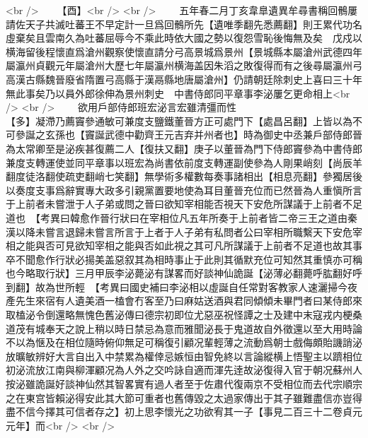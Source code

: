 <br />
　　【酉】<br />
<br />
　　五年春二月丁亥韋臯遺異牟尋書稱回鶻屢請佐天子共滅吐蕃王不早定計一旦爲回鶻所先【遺唯季翻先悉薦翻】則王累代功名虛棄矣且雲南久為吐蕃屈辱今不乘此時依大國之勢以復怨雪恥後悔無及矣　戊戍以横海留後程懷直爲滄州觀察使懷直請分弓高景城爲景州【景城縣本屬滄州武德四年屬瀛州貞觀元年屬滄州大歷七年屬瀛州横海盖因朱滔之敗復得而有之後尋屬瀛州弓高漢古縣魏晉廢省隋置弓高縣于漢鬲縣地唐屬滄州】仍請朝廷除刺史上喜曰三十年無此事矣乃以員外郎徐伸為景州刺史　中書侍郎同平章事李泌屢乞更命相上<br />
<br />
　　欲用戶部侍郎班宏泌言宏雖清彊而性　　　　　　　　　　　　　　　　　　　　【多】凝滯乃薦竇參通敏可兼度支鹽鐵董晉方正可處門下【處昌呂翻】上皆以為不可參誕之玄孫也【竇誕武德中勸齊王元吉弃并州者也】時為御史中丞兼戶部侍郎晉為太常卿至是泌疾甚復薦二人【復扶又翻】庚子以董晉為門下侍郎竇參為中書侍郎兼度支轉運使並同平章事以班宏為尚書依前度支轉運副使參為人剛果峭刻【尚辰羊翻度徒洛翻使疏吏翻峭七笑翻】無學術多權數每奏事諸相出【相息亮翻】參獨居後以奏度支事爲辭實專大政多引親黨置要地使為耳目董晉充位而已然晉為人重愼所言于上前者未嘗泄于人子弟或問之晉曰欲知宰相能否視天下安危所謀議于上前者不足道也　【考異曰韓愈作晉行狀曰在宰相位凡五年所奏于上前者皆二帝三王之道由秦漢以降未嘗言退歸未嘗言所言于上者于人子弟有私問者公曰宰相所職繫天下安危宰相之能與否可見欲知宰相之能與否如此視之其可凡所謀議于上前者不足道也故其事卒不聞愈作行狀必揚美盖惡叙其為相時事止于此則其循默充位可知然其重慎亦可稱也今略取行狀】三月甲辰李泌薨泌有謀畧而好談神仙詭誕【泌薄必翻薨呼肱翻好呼到翻】故為世所輕　【考異曰國史補曰李泌相以虛誕自任常對客教家人速灑掃今夜產先生來宿有人遺美酒一榼會冇客至乃曰麻姑送酒與君同傾傾未畢門者曰某侍郎來取榼泌令倒還略無愧色舊泌傳曰德宗初即位尤惡巫祝怪譚之士及建中末寇戎内梗桑道茂有城奉天之說上稍以時日禁忌為意而雅聞泌長于鬼道故自外徵還以至大用時論不以為惬及在相位隨時俯仰無足可稱復引顧况輩輕薄之流動爲朝士戲侮頗貽譏誚泌放曠敏辨好大言自出入中禁累為權倖忌嫉恒由智免終以言論縱横上悟聖主以躋相位初泌流放江南與柳渾顧况為人外之交吟詠自適而渾先逹故泌復得入官于朝况蘇州人按泌雖詭誕好談神仙然其智畧實有過人者至于佐肅代復兩京不受相位而去代宗順宗之在東宫皆賴泌得安此其大節可重者也舊傳毀之太過家傳出于其子雖難盡信亦豈得盡不信今擇其可信者存之】初上思李懷光之功欲宥其一子【事見二百三十二卷貞元元年】而<br />
<br />
